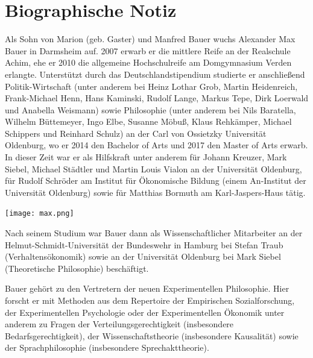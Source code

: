 \documentclass[justified,nobib,nohyper,symmetric,twoside]{tufte-book}
\begin{document}
\cleardoublepage
\chapter*{Biographische Notiz}
Als Sohn von Marion (geb. Gaster) und Manfred Bauer wuchs Alexander Max Bauer in Darmsheim auf.
2007 erwarb er die mittlere Reife an der Realschule Achim, ehe er 2010 die allgemeine Hochschulreife am Domgymnasium Verden erlangte.
Unterstützt durch das Deutschlandstipendium studierte er anschließend Politik-Wirtschaft (unter anderem bei Heinz Lothar Grob, Martin Heidenreich, Frank-Michael Henn, Hans Kaminski, Rudolf Lange, Markus Tepe, Dirk Loerwald und Anabella Weismann) sowie Philosophie (unter anderem bei Nils Baratella, Wilhelm Büttemeyer, Ingo Elbe, Susanne Möbuß, Klaus Rehkämper, Michael Schippers und Reinhard Schulz) an der Carl von Ossietzky Universität Oldenburg, wo er 2014 den Bachelor of Arts und 2017 den Master of Arts erwarb.
In dieser Zeit war er als Hilfskraft unter anderem für Johann Kreuzer, Mark Siebel, Michael Städtler und Martin Louis Vialon an der Universität Oldenburg, für Rudolf Schröder am Institut für Ökonomische Bildung (einem An-Institut der Universität Oldenburg) sowie für Matthias Bormuth am Karl-Jaspers-Haus tätig.

\begin{marginfigure}[-200pt]
   \texttt{[image: max.png]}
\end{marginfigure}


Nach seinem Studium war Bauer dann als Wissenschaftlicher Mitarbeiter an der Helmut-Schmidt-Universität der Bundeswehr in Hamburg bei Stefan Traub (Verhaltensökonomik) sowie an der Universität Oldenburg bei Mark Siebel (Theoretische Philosophie) beschäftigt.

Bauer gehört zu den Vertretern der neuen Experimentellen Philosophie.
Hier forscht er mit Methoden aus dem Repertoire der Empirischen Sozialforschung, der Experimentellen Psychologie oder der Experimentellen Ökonomik unter anderem zu Fragen der Verteilungsgerechtigkeit (insbesondere Bedarfsgerechtigkeit), der Wissenschaftstheorie (insbesondere Kausalität) sowie der Sprachphilosophie (insbesondere Sprechakttheorie).
\end{document}
